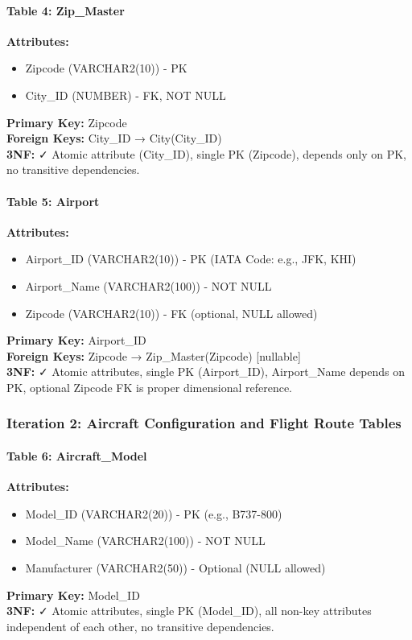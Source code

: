 \documentclass[12pt,a4paper,openany]{report}
\begin{document}
\paragraph{Table 4: Zip\_Master}
\textbf{Attributes:} 
\begin{itemize}
    \item Zipcode (VARCHAR2(10)) - PK
    \item City\_ID (NUMBER) - FK, NOT NULL
\end{itemize}
\textbf{Primary Key:} Zipcode\\
\textbf{Foreign Keys:} City\_ID → City(City\_ID)\\
\textbf{3NF:} ✓ Atomic attribute (City\_ID), single PK (Zipcode), depends only on PK, no transitive dependencies.

\paragraph{Table 5: Airport}
\textbf{Attributes:} 
\begin{itemize}
    \item Airport\_ID (VARCHAR2(10)) - PK (IATA Code: e.g., JFK, KHI)
    \item Airport\_Name (VARCHAR2(100)) - NOT NULL
    \item Zipcode (VARCHAR2(10)) - FK (optional, NULL allowed)
\end{itemize}
\textbf{Primary Key:} Airport\_ID\\
\textbf{Foreign Keys:} Zipcode → Zip\_Master(Zipcode) [nullable]\\
\textbf{3NF:} ✓ Atomic attributes, single PK (Airport\_ID), Airport\_Name depends on PK, optional Zipcode FK is proper dimensional reference.

\subsubsection{Iteration 2: Aircraft Configuration and Flight Route Tables}

\paragraph{Table 6: Aircraft\_Model}
\textbf{Attributes:} 
\begin{itemize}
    \item Model\_ID (VARCHAR2(20)) - PK (e.g., B737-800)
    \item Model\_Name (VARCHAR2(100)) - NOT NULL
    \item Manufacturer (VARCHAR2(50)) - Optional (NULL allowed)
\end{itemize}
\textbf{Primary Key:} Model\_ID\\
\textbf{3NF:} ✓ Atomic attributes, single PK (Model\_ID), all non-key attributes independent of each other, no transitive dependencies.
\end{document}
